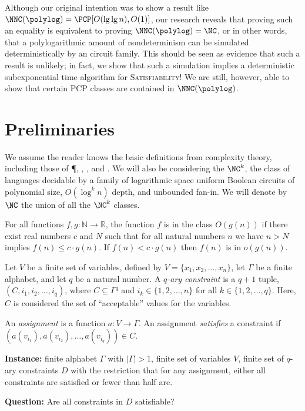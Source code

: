 \documentclass{article}
\begin{document}
Although our original intention was to show a result like $\NNC(\polylog) = \PCP[O(\lg \lg n), O(1)]$, our research reveals that proving such an equality is equivalent to proving $\NNC(\polylog) = \NC$, or in other words, that a polylogarithmic amount of nondeterminism can be simulated deterministically by an \NC{} circuit family.
This should be seen as evidence that such a result is unlikely; in fact, we show that such a simulation implies a deterministic subexponential time algorithm for \textsc{Satisfiability}!
We are still, however, able to show that certain PCP classes are contained in $\NNC(\polylog)$.

\section{Preliminaries}

We assume the reader knows the basic definitions from complexity theory, including those of \P, \NP, \DTIME, and \DSPACE.
We will also be considering the $\NC^k$, the class of languages decidable by a family of logarithmic space uniform Boolean circuits of polynomial size, $O(\log^k n)$ depth, and unbounded fan-in.
We will denote by $\NC$ the union of all the $\NC^k$ classes.

\begin{definition}
  For all functions $f, g \colon \mathbb{N} \to \mathbb{R}$, the function $f$ is in the class $O(g(n))$ if there exist real numbers $c$ and $N$ such that for all natural numbers $n$ we have $n > N$ implies $f(n) \leq c \cdot g(n)$.
  If $f(n) < c \cdot g(n)$ then $f(n)$ is in $o(g(n))$.
\end{definition}

\begin{definition}
  Let $V$ be a finite set of variables, defined by $V = \{x_1, x_2, \dotsc, x_n\}$, let $\Gamma$ be a finite alphabet, and let $q$ be a natural number.
  A \emph{$q$-ary constraint} is a $q + 1$ tuple, $(C, i_1, i_2, \dotsc, i_q)$, where $C \subseteq \Gamma^q$ and $i_k \in \{1, 2, \dotsc, n\}$ for all $k \in \{1, 2, \ldots, q\}$.
  Here, $C$ is considered the set of ``acceptable'' values for the variables.

  An \emph{assignment} is a function $a \colon V \to \Gamma$.
  An assignment \emph{satisfies} a constraint if $(a(v_{i_1}), a(v_{i_2}), \dotsc, a(v_{i_q})) \in C$.
\end{definition}

\begin{definition}
  \mbox{}

  \textbf{Instance:} finite alphabet $\Gamma$ with $|\Gamma| > 1$, finite set of variables $V$, finite set of $q$-ary constraints $D$ with the restriction that for any assignment, either all constraints are satisfied or fewer than half are.

  \textbf{Question:} Are all constraints in $D$ satisfiable?
\end{definition}
\end{document}
